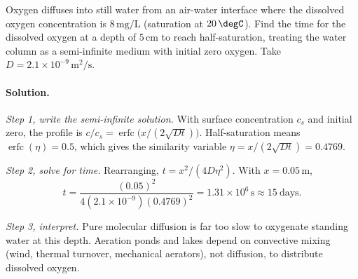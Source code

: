 \begin{exercise}
Oxygen diffuses into still water from an air-water interface where
the dissolved oxygen concentration is $8\,\text{mg/L}$ (saturation at
$20\,\degC$). Find the time for the dissolved oxygen at a depth of
$5\,\si{\centi\meter}$ to reach half-saturation, treating the water
column as a semi-infinite medium with initial zero oxygen. Take
$D = 2.1 \times 10^{-9}\,\text{m}^2/\text{s}$.

\paragraph{Solution.}
\textit{Step 1, write the semi-infinite solution.} With surface
concentration $c_s$ and initial zero, the profile is $c/c_s =
\operatorname{erfc}\!\big(x/(2\sqrt{Dt})\big)$. Half-saturation means
$\operatorname{erfc}(\eta) = 0.5$, which gives the similarity variable
$\eta = x/(2\sqrt{Dt}) = 0.4769$.

\textit{Step 2, solve for time.} Rearranging, $t = x^2/(4 D \eta^2)$.
With $x = 0.05\,\si{\meter}$,
\[
t = \frac{(0.05)^2}{4(2.1\times 10^{-9})(0.4769)^2}
= 1.31\times 10^{6}\,\text{s} \approx 15\ \text{days}.
\]

\textit{Step 3, interpret.} Pure molecular diffusion is far too slow to
oxygenate standing water at this depth. Aeration ponds and lakes depend
on convective mixing (wind, thermal turnover, mechanical aerators), not
diffusion, to distribute dissolved oxygen.
\end{exercise}

